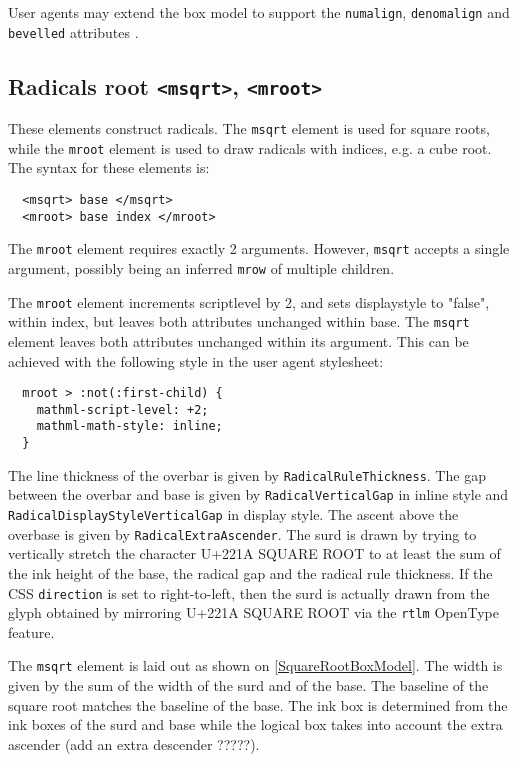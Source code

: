 User agents may extend the box model to support the {\tt numalign},
{\tt denomalign} and {\tt bevelled} attributes \cite{MathML3}.

\subsection{Radicals root {\tt <msqrt>}, {\tt <mroot>}}

These elements construct radicals. The {\tt msqrt} element is used for square
roots, while the {\tt mroot} element is used to draw radicals with indices,
e.g. a cube root. The syntax for these elements is:

\begin{lstlisting}
  <msqrt> base </msqrt>
  <mroot> base index </mroot>
\end{lstlisting}

The {\tt mroot} element requires exactly 2 arguments. However, {\tt msqrt}
accepts a single argument, possibly being an inferred {\tt mrow} of multiple
children.

The {\tt mroot} element increments scriptlevel by 2, and sets displaystyle to
"false", within index, but leaves both attributes unchanged within base. The
{\tt msqrt} element leaves both attributes unchanged within its argument.
This can be achieved with the following style in the user agent stylesheet:

\begin{lstlisting}
  mroot > :not(:first-child) {
    mathml-script-level: +2;
    mathml-math-style: inline;
  }
\end{lstlisting}

The line thickness of the overbar is given by {\tt RadicalRuleThickness}.
The gap between the overbar and base is given by {\tt RadicalVerticalGap}
in inline style and {\tt RadicalDisplayStyleVerticalGap} in display style.
The ascent above the overbase is given by {\tt RadicalExtraAscender}. The
surd is drawn by trying to vertically stretch the character U+221A SQUARE ROOT
to at least the sum of the ink height of the base, the radical gap and the
radical rule thickness. If the CSS {\tt direction} is set to right-to-left,
then the surd is actually drawn from the glyph obtained by mirroring
U+221A SQUARE ROOT via the {\tt rtlm} OpenType feature.

The {\tt msqrt} element is laid out as shown on \ref{SquareRootBoxModel}.
The width is given by the sum of the width of the surd and of the base.
The baseline of the square root matches the baseline of the base.
The ink box is determined from the ink boxes of the surd and base while the
logical box takes into account the extra ascender
(add an extra descender ?????).

